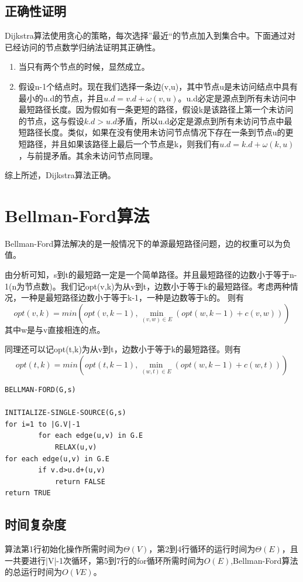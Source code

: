 \subsection{正确性证明}
Dijkstra算法使用贪心的策略，每次选择”最近“的节点加入到集合中。下面通过对已经访问的节点数学归纳法证明其正确性。

\begin{enumerate}
\item 当只有两个节点的时候，显然成立。

\item 假设n-1个结点时。现在我们选择一条边(v,u)，其中节点u是未访问结点中具有最小的u.d的节点，并且$u.d=v.d+\omega(v,u)$。u.d必定是源点到所有未访问中最短路径长度。因为假如有一条更短的路径，假设k是该路径上第一个未访问的节点，这与假设$k.d>u.d$矛盾，所以u.d必定是源点到所有未访问节点中最短路径长度。类似，如果在没有使用未访问节点情况下存在一条到节点u的更短路径，并且如果该路径上最后一个节点是k，则我们有$u.d=k.d+\omega(k,u)$，与前提矛盾。其余未访问节点同理。
\end{enumerate}

综上所述，Dijkstra算法正确。

\section{Bellman-Ford算法}
Bellman-Ford算法解决的是一般情况下的单源最短路径问题，边的权重可以为负值。

由分析可知，s到t的最短路一定是一个简单路径。并且最短路径的边数小于等于n-1(n为节点数)。我们记opt(v,k)为从v到t，边数小于等于k的最短路径。考虑两种情况，一种是最短路径边数小于等于k-1，一种是边数等于k的。
则有
$$opt(v,k)=min(opt(v,k-1),\min \limits_{(v,w)\in E}(opt(w,k-1)+c(v,w)))$$
其中w是与v直接相连的点。

同理还可以记opt(t,k)为从v到t，边数小于等于k的最短路径。则有
$$opt(t,k)=min(opt(t,k-1),\min \limits_{(w,t)\in E}(opt(w,k-1)+c(w,t)))$$

\begin{lstlisting}[caption=Bellman-Ford算法算法伪代码]
BELLMAN-FORD(G,s)

INITIALIZE-SINGLE-SOURCE(G,s)
for i=1 to |G.V|-1
        for each edge(u,v) in G.E
            RELAX(u,v)
for each edge(u,v) in G.E
        if v.d>u.d+(u,v)
            return FALSE
return TRUE

\end{lstlisting}

\subsection{时间复杂度}
算法第1行初始化操作所需时间为$\Theta (V)$，第2到4行循环的运行时间为$\Theta (E)$，且一共要进行|V|-1次循环，第5到7行的for循环所需时间为$O(E)$,Bellman-Ford算法的总运行时间为$O(VE)$。

